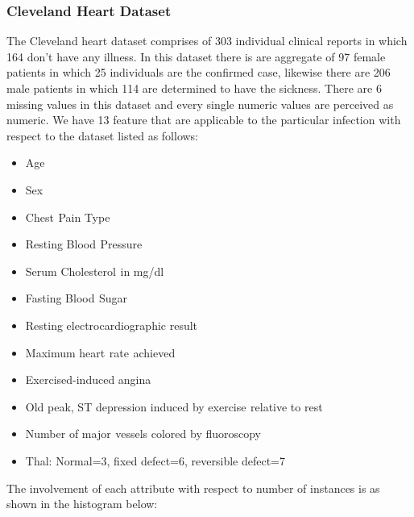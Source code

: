 \documentclass[oneside,12pt]{Classes/VTU}
\begin{document}
    \subsubsection{Cleveland Heart Dataset}
    The Cleveland heart dataset comprises of 303 individual clinical reports in which 164 don't have any illness. In this dataset there is are aggregate of 97 female patients in which 25 individuals are the confirmed case, likewise there are 206 male patients in which 114 are determined to have the sickness. There are 6 missing values in this dataset and every single numeric values are perceived as numeric. 
    We have 13 feature that are applicable to the particular infection with respect to the dataset listed as follows:
    \begin{itemize}
    	\item Age
    	\item Sex
    	\item Chest\tiny\textcolor{white}{s}\normalsize Pain Type\tiny\textcolor{white}{s}\normalsize
    	\item Resting Blood\tiny\textcolor{white}{s}\normalsize Pressure 
    	\item Serum Cholesterol\tiny\textcolor{white}{s}\normalsize in mg/dl 
    	\item Fasting Blood\tiny\textcolor{white}{s}\normalsize Sugar\tiny\textcolor{white}{s}\normalsize
    	\item Resting electrocardiographic result
    	\item Maximum heart\tiny\textcolor{white}{s}\normalsize rate\tiny\textcolor{white}{s}\normalsize achieved 
    	\item Exercised-induced angina\tiny\textcolor{white}{s}\normalsize
    	\item Old peak, ST depression induced by exercise\tiny\textcolor{white}{s}\normalsize relative to rest\tiny\textcolor{white}{s}\normalsize 
    	\item Number of major\tiny\textcolor{white}{s}\normalsize vessels colored by fluoroscopy 
    	\item Thal: Normal=3, fixed defect=6, reversible defect=7
    \end{itemize}
    The involvement of each attribute with respect to number of instances is as shown in the histogram below:
    
\end{document}
